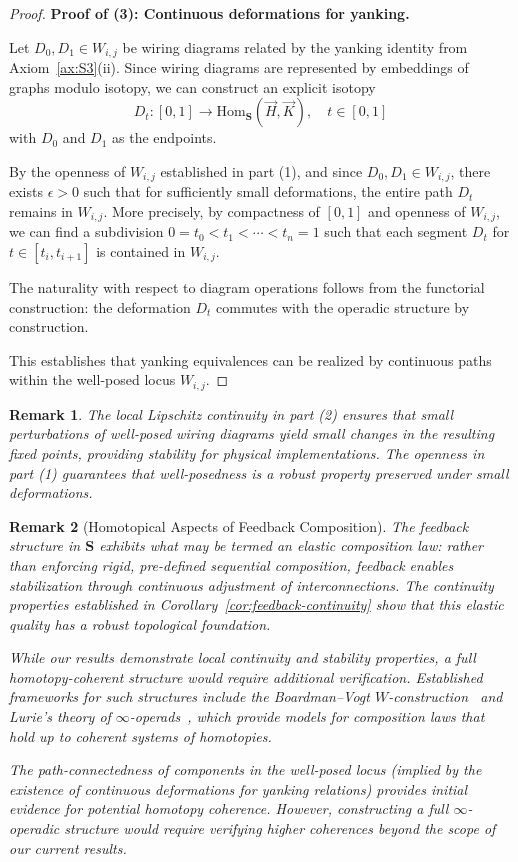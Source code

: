 \documentclass[11pt]{article}
\newtheorem{remark}{Remark}
\begin{document}
\begin{proof}
\medskip\noindent\textbf{Proof of (3): Continuous deformations for yanking.}

Let $D_0, D_1 \in W_{i,j}$ be wiring diagrams related by the yanking identity from Axiom~\ref{ax:S3}(ii). Since wiring diagrams are represented by embeddings of graphs modulo isotopy, we can construct an explicit isotopy
\[
D_t: [0,1] \to \mathrm{Hom}_{\mathbf S}(\vec H,\vec K), \quad t \in [0,1]
\]
with $D_0$ and $D_1$ as the endpoints.

By the openness of $W_{i,j}$ established in part (1), and since $D_0, D_1 \in W_{i,j}$, there exists $\epsilon > 0$ such that for sufficiently small deformations, the entire path $D_t$ remains in $W_{i,j}$. More precisely, by compactness of $[0,1]$ and openness of $W_{i,j}$, we can find a subdivision $0 = t_0 < t_1 < \cdots < t_n = 1$ such that each segment $D_t$ for $t \in [t_i, t_{i+1}]$ is contained in $W_{i,j}$.

The naturality with respect to diagram operations follows from the functorial construction: the deformation $D_t$ commutes with the operadic structure by construction.

This establishes that yanking equivalences can be realized by continuous paths within the well-posed locus $W_{i,j}$.
\end{proof}

\begin{remark}
The local Lipschitz continuity in part (2) ensures that small perturbations of well-posed wiring diagrams yield small changes in the resulting fixed points, providing stability for physical implementations. The openness in part (1) guarantees that well-posedness is a robust property preserved under small deformations.
\end{remark}

\begin{remark}[Homotopical Aspects of Feedback Composition]\label{rem:homotopy-aspects}
The feedback structure in $\mathbf{S}$ exhibits what may be termed an \emph{elastic composition law}: rather than enforcing rigid, pre-defined sequential composition, feedback enables stabilization through continuous adjustment of interconnections. The continuity properties established in Corollary~\ref{cor:feedback-continuity} show that this elastic quality has a robust topological foundation.

While our results demonstrate local continuity and stability properties, a full homotopy-coherent structure would require additional verification. Established frameworks for such structures include the Boardman--Vogt $W$-construction~\cite{boardman2006homotopy} and Lurie's theory of $\infty$-operads~\cite{lurie2014higher}, which provide models for composition laws that hold up to coherent systems of homotopies. 

The path-connectedness of components in the well-posed locus (implied by the existence of continuous deformations for yanking relations) provides initial evidence for potential homotopy coherence. However, constructing a full $\infty$-operadic structure would require verifying higher coherences beyond the scope of our current results.
\end{remark}
\end{document}

